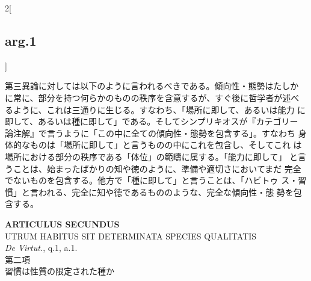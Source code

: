 \documentclass[paper=a4paper,fontsize=10pt,jafontsize=9pt,titlepage]{jlreq}
\begin{document}
\begin{paracol}{2}[\subsection{arg.1}]
\switchcolumn

第三異論に対しては以下のように言われるべきである。傾向性・態勢はたしか
に常に、部分を持つ何らかのものの秩序を含意するが、すぐ後に哲学者が述べ
るように、これは三通りに生じる。すなわち、「場所に即して、あるいは能力
に即して、あるいは種に即して」である。そしてシンプリキオスが『カテゴリー
論注解』で言うように「この中に全ての傾向性・態勢を包含する」。すなわち
身体的なものは「場所に即して」と言うものの中にこれを包含し、そしてこれ
は場所における部分の秩序である「体位」の範疇に属する。「能力に即して」
と言うことは、始まったばかりの知や徳のように、準備や適切さにおいてまだ
完全でないものを包含する。他方で「種に即して」と言うことは、「ハビトゥ
ス・習慣」と言われる、完全に知や徳であるもののような、完全な傾向性・態
勢を包含する。

\end{paracol}
\newpage


{}
\setcounter{section}{2}
\setcounter{subsection}{0}
\begin{center}
{\Large {\bfseries ARTICULUS SECUNDUS}}\\
{\large UTRUM HABITUS SIT DETERMINATA SPECIES QUALITATIS}\\
{\footnotesize {\itshape De Virtut.}, q.1, a.1.}\\
{\Large 第二項\\習慣は性質の限定された種か}
\end{center}
\end{document}

